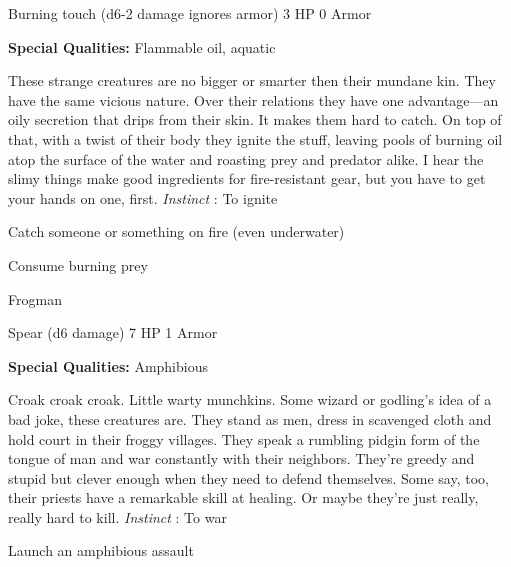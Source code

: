 Burning touch (d6-2 damage ignores armor)	3 HP	0 Armor

       


       
\startMonsterQualities
         {\bf Special Qualities:}  Flammable oil, aquatic
\stopMonsterQualities
       
\startMonsterDescription
These strange creatures are no bigger or smarter then their mundane kin. They have the same vicious nature. Over their relations they have one advantage—an oily secretion that drips from their skin. It makes them hard to catch. On top of that, with a twist of their body they ignite the stuff, leaving pools of burning oil atop the surface of the water and roasting prey and predator alike. I hear the slimy things make good ingredients for fire-resistant gear, but you have to get your hands on one, first. {\em Instinct} : To ignite
\stopMonsterDescription
       
\startitemize[1,packed]
         
\item Catch someone or something on fire (even underwater)

         
\item Consume burning prey

       
\stopitemize
       
\startMonsterName
Frogman	 
\stopMonsterName
       

Spear (d6 damage)	7 HP	1 Armor

       


       
\startMonsterQualities
         {\bf Special Qualities:}  Amphibious
\stopMonsterQualities
       
\startMonsterDescription
Croak croak croak. Little warty munchkins. Some wizard or godling’s idea of a bad joke, these creatures are. They stand as men, dress in scavenged cloth and hold court in their froggy villages. They speak a rumbling pidgin form of the tongue of man and war constantly with their neighbors. They’re greedy and stupid but clever enough when they need to defend themselves. Some say, too, their priests have a remarkable skill at healing. Or maybe they’re just really, really hard to kill. {\em Instinct} : To war
\stopMonsterDescription
       
\startitemize[1,packed]
         
\item Launch an amphibious assault

